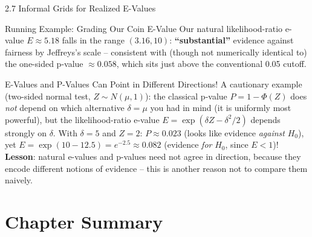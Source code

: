 \documentclass[aspectratio=169,10pt]{beamer}
\begin{document}
\begin{frame}[allowframebreaks]{2.7 Informal Grids for Realized E-Values}
  \begin{exampleblock}{Running Example: Grading Our Coin E-Value}
    Our natural likelihood-ratio e-value $E\approx5.18$ falls in the range
    $(3.16,10)$: \textbf{``substantial''} evidence against fairness by
    Jeffreys's scale -- consistent with (though not numerically identical
    to) the one-sided p-value $\approx0.058$, which sits just above the
    conventional 0.05 cutoff.
  \end{exampleblock}

  \begin{alertblock}{E-Values and P-Values Can Point in Different Directions!}
    A cautionary example (two-sided normal test, $Z\sim N(\mu,1)$): the
    classical p-value $P=1-\Phi(Z)$ does \emph{not} depend on which
    alternative $\delta=\mu$ you had in mind (it is uniformly most
    powerful), but the likelihood-ratio e-value
    $E=\exp(\delta Z-\delta^2/2)$ depends strongly on $\delta$. With
    $\delta=5$ and $Z=2$: $P\approx0.023$ (looks like evidence
    \emph{against} $H_0$), yet $E=\exp(10-12.5)=e^{-2.5}\approx0.082$
    (evidence \emph{for} $H_0$, since $E<1$)! \textbf{Lesson}: natural
    e-values and p-values need not agree in direction, because they encode
    different notions of evidence -- this is another reason not to compare
    them naively.
  \end{alertblock}

\end{frame}

\section{Chapter Summary}
\end{document}
